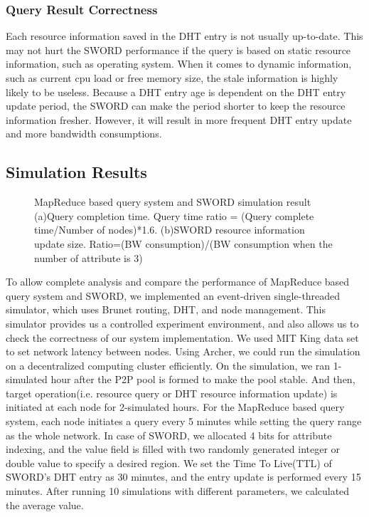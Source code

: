 \documentclass{acm_proc_article-sp}
\begin{document}
\subsubsection{Query Result Correctness}
Each resource information saved in the DHT entry is not usually up-to-date. This may not hurt the SWORD performance if the query is based on static resource information, such as operating system. 
When it comes to dynamic information, such as current cpu load or free memory size, the stale information is highly likely to be useless. 
Because a DHT entry age is dependent on the DHT entry update period, the SWORD can make the period shorter to keep the resource information fresher.
However, it will result in more frequent DHT entry update and more bandwidth consumptions.
\subsection{Simulation Results}
\begin{figure}[t]
\centering
{}
\caption{MapReduce based query system and SWORD simulation result (a)Query completion time. Query time ratio = (Query complete time/Number of nodes)*1.6. 
(b)SWORD resource information update size. Ratio=(BW consumption)/(BW consumption when the number of attribute is 3)}
\end{figure}
To allow complete analysis and compare the performance of MapReduce based query system and SWORD, we implemented an event-driven single-threaded simulator, which uses Brunet\cite{brunet} routing, DHT, and node management.
This simulator provides us a controlled experiment environment, and also allows us to check the correctness of our system implementation. We used MIT King data set\cite{king} to set network latency between nodes.
Using Archer\cite{archer}, we could run the simulation on a decentralized computing cluster efficiently. 
On the simulation, we ran 1-simulated hour after the P2P pool is formed to make the pool stable. And then, target operation(i.e. resource query or DHT resource information update) is initiated at each node for 2-simulated hours.
For the MapReduce based query system, each node initiates a query every 5 minutes while setting the query range as the whole network. 
In case of SWORD, we allocated 4 bits for attribute indexing, and the value field is filled with two randomly generated integer or double value to specify a desired region. 
We set the Time To Live(TTL) of SWORD's DHT entry as 30 minutes, and the entry update is performed every 15 minutes.
After running 10 simulations with different parameters, we calculated the average value.
\end{document}
